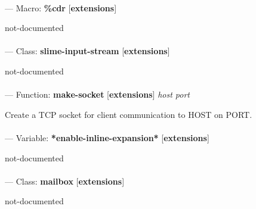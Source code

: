\paragraph{}
\label{EXTENSIONS:CDR}
--- Macro: \textbf{\%cdr} [\textbf{extensions}] \textit{}

\begin{adjustwidth}{5em}{5em}
not-documented
\end{adjustwidth}

\paragraph{}
\label{EXTENSIONS:SLIME-INPUT-STREAM}
--- Class: \textbf{slime-input-stream} [\textbf{extensions}] \textit{}

\begin{adjustwidth}{5em}{5em}
not-documented
\end{adjustwidth}

\paragraph{}
\label{EXTENSIONS:MAKE-SOCKET}
--- Function: \textbf{make-socket} [\textbf{extensions}] \textit{host port}

\begin{adjustwidth}{5em}{5em}
Create a TCP socket for client communication to HOST on PORT.
\end{adjustwidth}

\paragraph{}
\label{EXTENSIONS:*ENABLE-INLINE-EXPANSION*}
--- Variable: \textbf{*enable-inline-expansion*} [\textbf{extensions}] \textit{}

\begin{adjustwidth}{5em}{5em}
not-documented
\end{adjustwidth}

\paragraph{}
\label{EXTENSIONS:MAILBOX}
--- Class: \textbf{mailbox} [\textbf{extensions}] \textit{}

\begin{adjustwidth}{5em}{5em}
not-documented
\end{adjustwidth}


